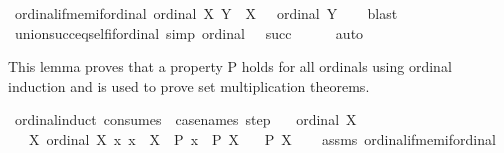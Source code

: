 \begin{isabellebody}
\isadelimproof
%
\endisadelimproof
\isanewline
\isanewline
{}\isamarkupfalse%
\ ordinal{\isacharunderscore}{\kern0pt}if{\isacharunderscore}{\kern0pt}mem{\isacharunderscore}{\kern0pt}if{\isacharunderscore}{\kern0pt}ordinal{\isacharcolon}{\kern0pt}\ {\isachardoublequoteopen}{\isasymlbrakk}ordinal\ X{\isacharsemicolon}{\kern0pt}\ Y\ {\isasymin}\ X{\isasymrbrakk}\ \ {\isasymLongrightarrow}\ ordinal\ Y{\isachardoublequoteclose}\isanewline
%
\isadelimproof
\ \ %
\endisadelimproof
%
\isatagproof
{}\isamarkupfalse%
\ blast%
\endisatagproof
{\isafoldproof}%
%
\isadelimproof
\isanewline
%
\endisadelimproof
\isanewline
{}\isamarkupfalse%
\ union{\isacharunderscore}{\kern0pt}succ{\isacharunderscore}{\kern0pt}eq{\isacharunderscore}{\kern0pt}self{\isacharunderscore}{\kern0pt}if{\isacharunderscore}{\kern0pt}ordinal\ {\isacharbrackleft}{\kern0pt}simp{\isacharbrackright}{\kern0pt}{\isacharcolon}{\kern0pt}\ {\isachardoublequoteopen}ordinal\ {\isasymbeta}\ {\isasymLongrightarrow}\ {\isasymUnion}{\isacharparenleft}{\kern0pt}succ\ {\isasymbeta}{\isacharparenright}{\kern0pt}\ {\isacharequal}{\kern0pt}\ {\isasymbeta}{\isachardoublequoteclose}%
\isadelimproof
\ %
\endisadelimproof
%
\isatagproof
{}\isamarkupfalse%
\ auto%
\endisatagproof
{\isafoldproof}%
%
\isadelimproof
%
\endisadelimproof
%
\begin{isamarkuptext}%
This lemma proves that a property P holds for all ordinals using ordinal induction 
and is used to prove set multiplication theorems.%
\end{isamarkuptext}\isamarkuptrue%
\isamarkupfalse%
\ ordinal{\isacharunderscore}{\kern0pt}induct\ {\isacharbrackleft}{\kern0pt}consumes\ {}{\isacharcomma}{\kern0pt}\ case{\isacharunderscore}{\kern0pt}names\ step{\isacharbrackright}{\kern0pt}{\isacharcolon}{\kern0pt}\isanewline
\ \ \ {\isachardoublequoteopen}ordinal\ X{\isachardoublequoteclose}\isanewline
\ \ \ {\isachardoublequoteopen}{\isasymAnd}X{\isachardot}{\kern0pt}\ {\isasymlbrakk}ordinal\ X{\isacharsemicolon}{\kern0pt}\ {\isasymAnd}x{\isachardot}{\kern0pt}\ x\ {\isasymin}\ X\ {\isasymLongrightarrow}\ P\ x{\isasymrbrakk}\ {\isasymLongrightarrow}\ P\ X{\isachardoublequoteclose}\isanewline
\ \ \ {\isachardoublequoteopen}P\ X{\isachardoublequoteclose}\isanewline
%
\isadelimproof
\ \ %
\endisadelimproof
%
\isatagproof
{}\isamarkupfalse%
\ assms\ ordinal{\isacharunderscore}{\kern0pt}if{\isacharunderscore}{\kern0pt}mem{\isacharunderscore}{\kern0pt}if{\isacharunderscore}{\kern0pt}ordinal\isanewline

\end{isabellebody}
